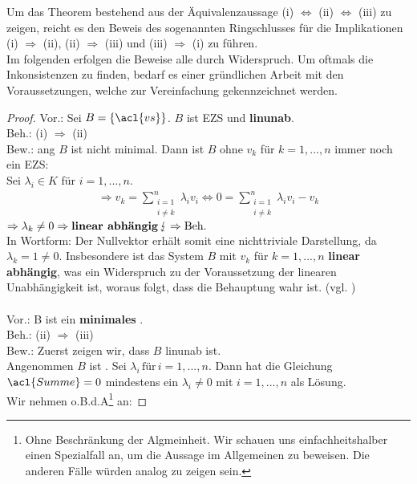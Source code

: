 Um das Theorem bestehend aus der Äquivalenzaussage (i) $\Leftrightarrow$ (ii) $\Leftrightarrow$ (iii) zu zeigen, reicht es den Beweis des sogenannten Ringschlusses für die Implikationen (i) $\Rightarrow$ (ii), (ii) $\Rightarrow$ (iii) und (iii) $\Rightarrow$ (i) zu führen.
\\ Im folgenden erfolgen die Beweise alle durch Widerspruch. Um oftmals die Inkonsistenzen zu finden, bedarf es einer gründlichen Arbeit mit den Voraussetzungen, welche zur Vereinfachung gekennzeichnet werden.

\begin{proof}  
Vor.: Sei $B = \{\acl{vs}\}$. $B$ ist \acl{EZS} und \textbf{\acl{linunab}}.
\\ Beh.: (i) $\Rightarrow$ (ii) 
\\ Bew.: \acl{ang} $B$ ist nicht minimal. Dann ist $B$ ohne $v_k$ für $k=1,...,n$ immer noch ein \acl{EZS}:
\\ Sei $\lambda_i \in K$ für $i=1,...,n$.
\begin{align*}\Rightarrow v_k = \sum \limits_{\substack{i=1\\i\not=k}}^{n}\lambda_i v_i
\Leftrightarrow 0 = \sum \limits_{\substack{i=1\\i\not=k}}^{n}\lambda_i v_i - v_k 
\end{align*}
\(\Rightarrow \lambda_k \not= 0 \Rightarrow \text{\textbf{linear abhängig}} \, \lightning
\Rightarrow \text{Beh.} \)
\\In Wortform: Der Nullvektor erhält somit eine nichttriviale Darstellung, da $\lambda_k=1\not=0$. Insbesondere ist das System $B$ mit $v_k$ für $k=1,...,n$ \textbf{linear abhängig}, was ein Widerspruch zu der Voraussetzung der linearen Unabhängigkeit ist, woraus folgt, dass die Behauptung wahr ist. (vgl. \cite[S. 41, 9.16 (a) $\Rightarrow$ (b)]{Skript})
\\
\\ Vor.: B ist ein \textbf{minimales }.
\\ Beh.: (ii) $\Rightarrow$ (iii) 
\\ Bew.: Zuerst zeigen wir, dass $B$ \acl{linunab} ist.
\\ Angenommen $B$ ist . Sei \(\lambda_i \, \text{für} \, i=1,...,n\). Dann hat die Gleichung \(\acl{Summe}=0\) mindestens ein $\lambda_i\not=0$ mit $i=1,...,n$ als Lösung.
\\Wir nehmen o.B.d.A\footnote{Ohne Beschränkung der Algmeinheit. Wir schauen uns einfachheitshalber einen Spezialfall an, um die Aussage im Allgemeinen zu beweisen. Die anderen Fälle würden analog zu zeigen sein.} an:

\end{proof}
